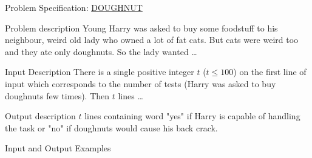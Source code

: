\documentclass{beamer}
\begin{document}

\begin{frame}{Problem Specification: \href{https://www.spoj.com/problems/DOUGHNUT/}{DOUGHNUT}}
  \begin{block}{Problem description}
    Young Harry was asked to buy some foodstuff to his neighbour, weird old lady who owned a lot of fat cats. But cats were weird too and they ate only doughnuts. So the lady wanted \dots
  \end{block}

  \begin{block}{Input Description}
    There is a single positive integer $t$ ($t \leq 100$) on the first line of input which corresponds to the number of tests (Harry was asked to buy doughnuts few times). Then $t$ lines \dots
  \end{block}

  \begin{block}{Output description}
    $t$ lines containing word "yes" if Harry is capable of handling the task or "no" if doughnuts would cause his back crack.
  \end{block}

  \begin{block}{Input and Output Examples}
  \end{block}

\end{frame}



\end{document}

